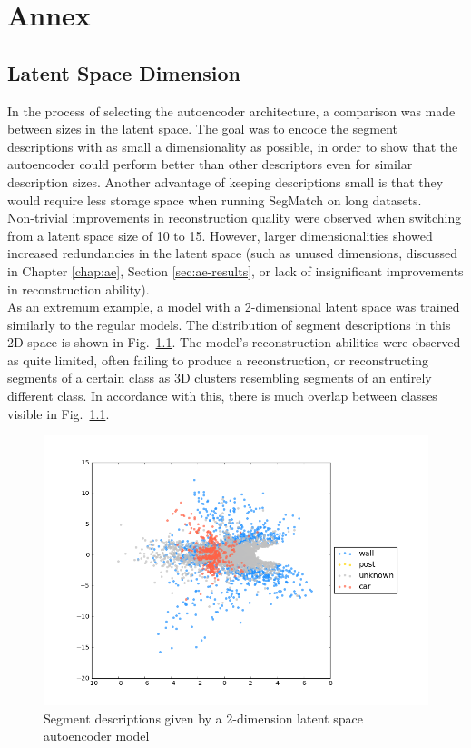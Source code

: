 \chapter{Annex}\label{sec:irgendwas}

\section{Latent Space Dimension}

In the process of selecting the autoencoder architecture, a comparison was made between sizes in the latent space. The goal was to encode the segment descriptions with as small a dimensionality as possible, in order to show that the autoencoder could perform better than other descriptors even for similar description sizes. Another advantage of keeping descriptions small is that they would require less storage space when running SegMatch on long datasets.\\

Non-trivial improvements in reconstruction quality were observed when switching from a latent space size of 10 to 15. However, larger dimensionalities showed increased redundancies in the latent space (such as unused dimensions, discussed in Chapter \ref{chap:ae}, Section \ref{sec:ae-results}, or lack of insignificant improvements in reconstruction ability).\\

As an extremum example, a model with a 2-dimensional latent space was trained similarly to the regular models. The distribution of segment descriptions in this 2D space is shown in Fig.~\ref{fig:2d_latent_space}. The model's reconstruction abilities were observed as quite limited, often failing to produce a reconstruction, or reconstructing segments of a certain class as 3D clusters resembling segments of an entirely different class. In accordance with this, there is much overlap between classes visible in Fig.~\ref{fig:2d_latent_space}.\\

\begin{figure}
  \centering
  \includegraphics[width=5.2in]{images/2dlatentspace.png}
  \caption{Segment descriptions given by a 2-dimension latent space autoencoder model}
  \label{fig:2d_latent_space}
\end{figure}
